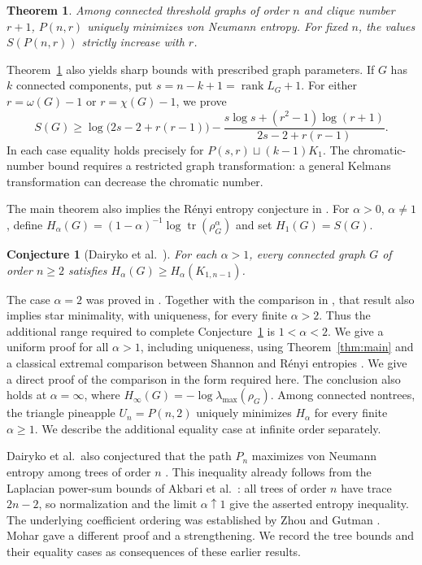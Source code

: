 \documentclass[11pt,a4paper,reqno]{amsart}
\newtheorem{theorem}{Theorem}[section]
\newtheorem{conjecture}{Conjecture}[section]
\theoremstyle{remark}
\newcommand{\tr}{\operatorname{tr}}
\newcommand{\Ent}{S}
\newcommand{\Pine}{P}
\numberwithin{equation}{section}
\begin{document}
\begin{theorem}\label{thm:threshold}
Among connected threshold graphs of order $n$ and clique number $r+1$,
$\Pine(n,r)$ uniquely minimizes von Neumann entropy. For fixed $n$,
the values $\Ent(\Pine(n,r))$ strictly increase with $r$.
\end{theorem}

Theorem~\ref{thm:threshold} also yields sharp bounds with prescribed
graph parameters. If $G$ has $k$ connected components,
put $s=n-k+1=\operatorname{rank}L_G+1$. For either
$r=\omega(G)-1$ or $r=\chi(G)-1$, we prove
\begin{equation}\label{eq:intro-parameter-bound}
 \Ent(G)\ge\log\bigl(2s-2+r(r-1)\bigr)
 -\frac{s\log s+(r^2-1)\log(r+1)}{2s-2+r(r-1)}.
\end{equation}
In each case equality holds precisely for
$\Pine(s,r)\sqcup(k-1)K_1$. The chromatic-number bound requires a
restricted graph transformation: a general Kelmans transformation
can decrease the chromatic number.

The main theorem also implies the R\'enyi entropy conjecture in \cite{Dairyko2017}.
For $\alpha>0$, $\alpha\ne1$, define
$H_\alpha(G)=(1-\alpha)^{-1}\log\tr(\rho_G^\alpha)$ and set
$H_1(G)=\Ent(G)$.

\begin{conjecture}[Dairyko et al.\ {\cite[Conjecture 3.3]{Dairyko2017}}]\label{conj:star-renyi}
For each $\alpha>1$, every connected graph $G$ of order $n\ge2$
satisfies $H_\alpha(G)\ge H_\alpha(K_{1,n-1})$.
\end{conjecture}

The case $\alpha=2$ was proved in \cite[Theorem 3.8]{Dairyko2017}.
Together with the comparison in \cite[Theorem 3]{Harremoes2009},
that result also implies star minimality, with uniqueness, for every
finite $\alpha>2$. Thus the additional range required to complete
Conjecture~\ref{conj:star-renyi} is $1<\alpha<2$.
We give a uniform proof for all $\alpha>1$, including uniqueness, using
Theorem~\ref{thm:main} and a classical extremal comparison between
Shannon and R\'enyi entropies
\cite{Harremoes2009,SakaiIwata2016}. We give a direct proof of the
comparison in the form required here. The conclusion also holds at
$\alpha=\infty$, where $H_\infty(G)=-\log\lambda_{\max}(\rho_G)$.
Among connected nontrees, the triangle pineapple
$U_n=\Pine(n,2)$ uniquely minimizes $H_\alpha$ for every finite
$\alpha\ge1$. We describe the additional equality case at infinite
order separately.

Dairyko et al.\ also conjectured that the path $P_n$ maximizes
von Neumann entropy among trees of order $n$
\cite[Conjecture 1.3]{Dairyko2017}. This inequality already follows
from the Laplacian power-sum bounds of Akbari et al.\
\cite[Corollary 7]{Akbari2010}: all trees of
order $n$ have trace $2n-2$, so normalization and the limit
$\alpha\uparrow1$ give the asserted entropy inequality. The
underlying coefficient ordering was established by Zhou and Gutman
\cite[Theorems 7 and 8]{ZhouGutman2008}. Mohar \cite{Mohar2007}
gave a different proof and a strengthening. We record the tree bounds
and their equality cases as consequences of these earlier results.
\end{document}
